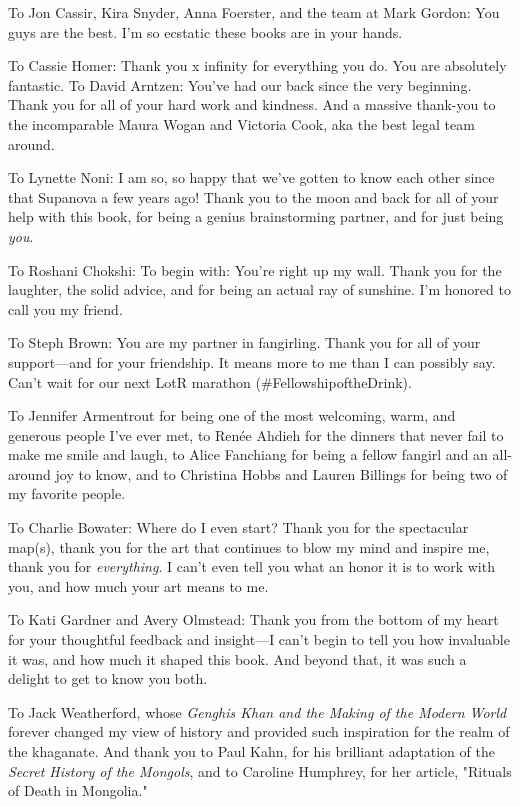 To Jon Cassir, Kira Snyder, Anna Foerster, and the team at Mark Gordon:
You guys are the best. I'm so ecstatic these books are in your hands.

To Cassie Homer: Thank you x infinity for everything you do. You are absolutely fantastic. To David Arntzen: You've had our back since the very beginning. Thank you for all of your hard work and kindness. And a massive thank-you to the incomparable Maura Wogan and Victoria Cook, aka the best legal team around.

To Lynette Noni: I am so, so happy that we've gotten to know each other since that Supanova a few years ago! Thank you to the moon and back for all of your help with this book, for being a genius brainstorming partner, and for just being \emph{you}.

To Roshani Chokshi: To begin with: You're right up my wall. Thank you for the laughter, the solid advice, and for being an actual ray of sunshine. I'm honored to call you my friend.

To Steph Brown: You are my partner in fangirling. Thank you for all of your support---and for your friendship. It means more to me than I can possibly say. Can't wait for our next LotR marathon
(\#FellowshipoftheDrink).

To Jennifer Armentrout for being one of the most welcoming, warm, and generous people I've ever met, to Renée Ahdieh for the dinners that never fail to make me smile and laugh, to Alice Fanchiang for being a fellow fangirl and an all-around joy to know, and to Christina Hobbs and Lauren Billings for being two of my favorite people.

To Charlie Bowater: Where do I even start? Thank you for the spectacular map(s), thank you for the art that continues to blow my mind and inspire me, thank you for \emph{everything}. I can't even tell you what an honor it is to work with you, and how much your art means to me.

To Kati Gardner and Avery Olmstead: Thank you from the bottom of my heart for your thoughtful feedback and insight---I can't begin to tell you how invaluable it was, and how much it shaped this book. And beyond that, it was such a delight to get to know you both.

To Jack Weatherford, whose \emph{Genghis Khan and the Making of the Modern World} forever changed my view of history and provided such inspiration for the realm of the khaganate. And thank you to Paul Kahn, for his brilliant adaptation of the \emph{Secret History of the Mongols}, and to Caroline Humphrey, for her article, "Rituals of Death in Mongolia."

